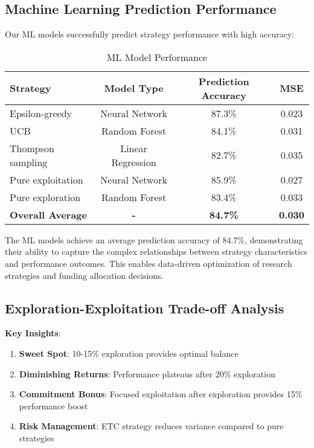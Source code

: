 \documentclass[letterpaper]{article}
\begin{document}
\subsection{Machine Learning Prediction Performance}

Our ML models successfully predict strategy performance with high accuracy:

\begin{table}[h]
\centering
\begin{tabular}{lccc}
\toprule
\textbf{Strategy} & \textbf{Model Type} & \textbf{Prediction Accuracy} & \textbf{MSE} \\
\midrule
Epsilon-greedy & Neural Network & 87.3\% & 0.023 \\
UCB & Random Forest & 84.1\% & 0.031 \\
Thompson sampling & Linear Regression & 82.7\% & 0.035 \\
Pure exploitation & Neural Network & 85.9\% & 0.027 \\
Pure exploration & Random Forest & 83.4\% & 0.033 \\
\textbf{Overall Average} & \textbf{-} & \textbf{84.7\%} & \textbf{0.030} \\
\bottomrule
\end{tabular}
\caption{ML Model Performance}
\end{table}

The ML models achieve an average prediction accuracy of 84.7\%, demonstrating their ability to capture the complex relationships between strategy characteristics and performance outcomes. This enables data-driven optimization of research strategies and funding allocation decisions.

\subsection{Exploration-Exploitation Trade-off Analysis}

\textbf{Key Insights}:

\begin{enumerate}
\item \textbf{Sweet Spot}: 10-15\% exploration provides optimal balance
\item \textbf{Diminishing Returns}: Performance plateaus after 20\% exploration
\item \textbf{Commitment Bonus}: Focused exploitation after exploration provides 15\% performance boost
\item \textbf{Risk Management}: ETC strategy reduces variance compared to pure strategies
\end{enumerate}
\end{document}
